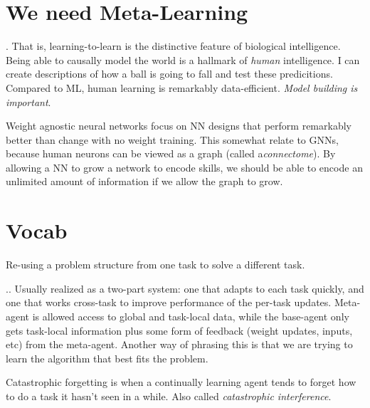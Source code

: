 \documentclass[american]{IEEEtran}   	%
\begin{document}
\section{We need Meta-Learning}
\cite{Lake_2016}.
That is, learning-to-learn is the distinctive feature of biological intelligence.
Being able to causally model the world is a hallmark of \textit{human} intelligence.
I can create descriptions of how a ball is going to fall and test these predicitions.
Compared to ML, human learning is remarkably data-efficient.
\textit{Model building is important}.

Weight agnostic neural networks focus on NN designs that perform remarkably better than change with no weight training\cite{gaier2019weight}.
This somewhat relate to GNNs, because human neurons can be viewed as a graph (called a\textit{connectome}).
By allowing a NN to grow a network to encode skills, we should be able to encode an unlimited amount of information if we allow the graph to grow.

\section{Vocab}

\begin{description}[leftmargin=1cm, style=nextline]
	\item[Transfer Learning]
		Re-using a problem structure from one task to solve a different task\cite{andrychowicz2016learning}.
	\item[Metalearning]
		.\cite{wang2016learning}. 
		Usually realized as a two-part system: one that adapts to each task quickly, and one that works cross-task to improve performance of the per-task updates. 
		Meta-agent is allowed access to global and task-local data, while the base-agent only gets task-local information plus some form of feedback (weight updates, inputs, etc) from the meta-agent\cite{Ravi2017OptimizationAA}.
		Another way of phrasing this is that we are trying to learn the algorithm that best fits the problem\cite{duan2017oneshot}.
	\item[Catastrophic Forgetting]
		Catastrophic forgetting is when a continually learning agent tends to forget how to do a task it hasn't seen in a while\cite{Kirkpatrick_2017}.
		Also called \textit{catastrophic interference}\cite{pmlr-v48-santoro16}.
\end{description}
\newpage

\nocite{*}


\end{document}
